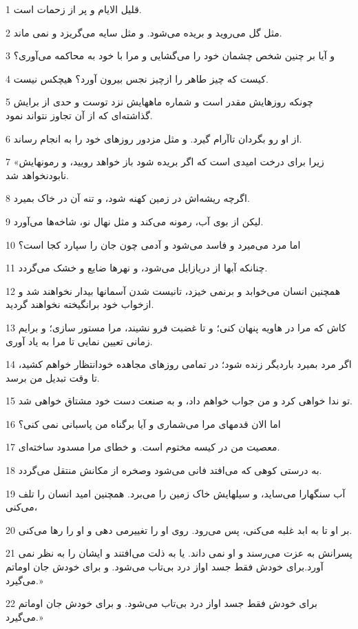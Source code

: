 \par 1 قلیل الایام و پر از زحمات است.
\par 2 مثل گل می‌روید و بریده می‌شود. و مثل سایه می‌گریزد و نمی ماند.
\par 3 و آیا بر چنین شخص چشمان خود را می‌گشایی و مرا با خود به محاکمه می‌آوری؟
\par 4 کیست که چیز طاهر را ازچیز نجس بیرون آورد؟ هیچکس نیست.
\par 5 چونکه روزهایش مقدر است و شماره ماههایش نزد توست و حدی از برایش گذاشته‌ای که از آن تجاوز نتواند نمود.
\par 6 از او رو بگردان تاآرام گیرد. و مثل مزدور روزهای خود را به انجام رساند.
\par 7 «زیرا برای درخت امیدی است که اگر بریده شود باز خواهد رویید، و رمونهایش نابودنخواهد شد.
\par 8 اگر‌چه ریشه‌اش در زمین کهنه شود، و تنه آن در خاک بمیرد.
\par 9 لیکن از بوی آب، رمونه می‌کند و مثل نهال نو، شاخه‌ها می‌آورد.
\par 10 اما مرد می‌میرد و فاسد می‌شود و آدمی چون جان را سپارد کجا است؟
\par 11 چنانکه آبها از دریازایل می‌شود، و نهرها ضایع و خشک می‌گردد.
\par 12 همچنین انسان می‌خوابد و برنمی خیزد، تانیست شدن آسمانها بیدار نخواهند شد و ازخواب خود برانگیخته نخواهند گردید.
\par 13 کاش که مرا در هاویه پنهان کنی؛ و تا غضبت فرو نشیند، مرا مستور سازی؛ و برایم زمانی تعیین نمایی تا مرا به یاد آوری.
\par 14 اگر مرد بمیرد باردیگر زنده شود؛ در تمامی روزهای مجاهده خودانتظار خواهم کشید، تا وقت تبدیل من برسد.
\par 15 تو ندا خواهی کرد و من جواب خواهم داد، و به صنعت دست خود مشتاق خواهی شد.
\par 16 اما الان قدمهای مرا می‌شماری و آیا برگناه من پاسبانی نمی کنی؟
\par 17 معصیت من در کیسه مختوم است. و خطای مرا مسدود ساخته‌ای.
\par 18 به درستی کوهی که می‌افتد فانی می‌شود وصخره از مکانش منتقل می‌گردد.
\par 19 آب سنگهارا می‌ساید، و سیلهایش خاک زمین را می‌برد. همچنین امید انسان را تلف می‌کنی،
\par 20 بر او تا به ابد غلبه می‌کنی، پس می‌رود. روی او را تغییرمی دهی و او را رها می‌کنی.
\par 21 پسرانش به عزت می‌رسند و او نمی داند. یا به ذلت می‌افتند و ایشان را به نظر نمی آورد.برای خودش فقط جسد اواز درد بی‌تاب می‌شود. و برای خودش جان اوماتم می‌گیرد.»
\par 22 برای خودش فقط جسد اواز درد بی‌تاب می‌شود. و برای خودش جان اوماتم می‌گیرد.»
 
